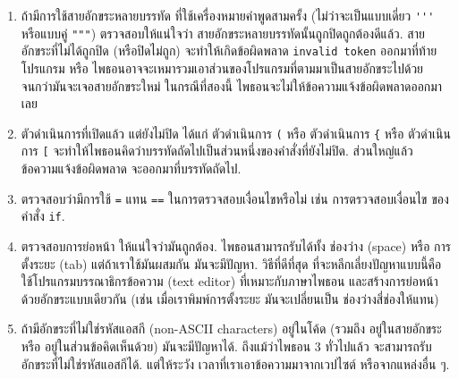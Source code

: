 \begin{enumerate}
\item ถ้ามีการใช้สายอักขระหลายบรรทัด ที่ใช้เครื่องหมายคำพูดสามครั้ง (ไม่ว่าจะเป็นแบบเดี่ยว \verb|'''| หรือแบบคู่ \verb|"""|)
ตรวจสอบให้แน่ใจว่า สายอักขระหลายบรรทัดนั้นถูกปิดถูกต้องดีแล้ว.
สายอักขระที่ไม่ได้ถูกปิด (หรือปิดไม่ถูก) จะทำให้เกิดข้อผิดพลาด \texttt{invalid token} ออกมาที่ท้ายโปรแกรม
หรือ ไพธอนอาจจะเหมารวมเอาส่วนของโปรแกรมที่ตามมาเป็นสายอักขระไปด้วย 
จนกว่ามันจะเจอสายอักขระใหม่
ในกรณีที่สองนี้ ไพธอนจะไม่ให้ข้อความแจ้งข้อผิดพลาดออกมาเลย


\item ตัวดำเนินการที่เปิดแล้ว แต่ยังไม่ปิด ได้แก่ ตัวดำเนินการ \verb|(| หรือ ตัวดำเนินการ \verb|{| หรือ ตัวดำเนินการ \verb|[|
จะทำให้ไพธอนคิดว่าบรรทัดถัดไปเป็นส่วนหนึ่งของคำสั่งที่ยังไม่ปิด.
ส่วนใหญ่แล้ว ข้อความแจ้งข้อผิดพลาด จะออกมาที่บรรทัดถัดไป.



\item ตรวจสอบว่ามีการใช้ \texttt{=} แทน \texttt{==} ในการตรวจสอบเงื่อนไขหรือไม่ เช่น การตรวจสอบเงื่อนไข ของคำสั่ง \verb|if|.


\item ตรวจสอบการย่อหน้า ให้แน่ใจว่ามันถูกต้อง.
ไพธอนสามารถรับได้ทั้ง ช่องว่าง (space) หรือ การตั้งระยะ (tab)
แต่ถ้าเราใช้มันผสมกัน มันจะมีปัญหา.
วิธีที่ดีที่สุด ที่จะหลีกเลี่ยงปัญหาแบบนี้คือ ใช้โปรแกรมบรรณาธิกรข้อความ (text editor) ที่เหมาะกับภาษาไพธอน และสร้างการย่อหน้าด้วยอักขระแบบเดียวกัน (เช่น เมื่อเราพิมพ์การตั้งระยะ มันจะเปลี่ยนเป็น ช่องว่างสี่ช่องให้แทน)



\item ถ้ามีอักขระที่ไม่ใช่รหัสแอสกี (non-ASCII characters) อยู่ในโค้ด (รวมถึง อยู่ในสายอักขระ หรือ อยู่ในส่วนข้อคิดเห็นด้วย) มันจะมีปัญหาได้.
ถึงแม้ว่าไพธอน 3 ทั่วไปแล้ว จะสามารถรับอักขระที่ไม่ใช่รหัสแอสกีได้.
แต่ให้ระวัง เวลาที่เราเอาข้อความมาจากเวปไซต์ หรือจากแหล่งอื่น ๆ.


\end{enumerate}


